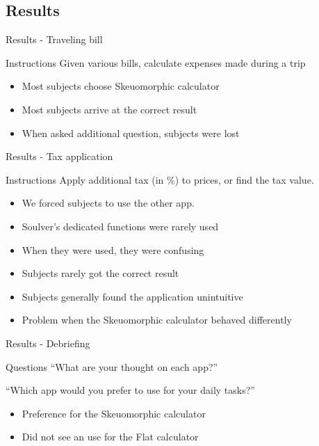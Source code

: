 \documentclass{beamer}
\begin{document}
\subsection{Results}

\begin{frame}{Results - Traveling bill}

    \begin{block}{Instructions}
        Given various bills, calculate expenses made during a trip
    \end{block}

    \begin{itemize}
        \item Most subjects choose Skeuomorphic calculator
        \item Most subjects arrive at the correct result
        \item When asked additional question, subjects were lost
    \end{itemize}

\end{frame}

\begin{frame}{Results - Tax application}

    \begin{block}{Instructions}
        Apply additional tax (in \%) to prices, or find the tax value.
    \end{block}

    \begin{itemize}
        \item We forced subjects to use the other app.
        \item Soulver's dedicated functions were rarely used
        \item When they were used, they were confusing
        \item Subjects rarely got the correct result
        \item Subjects generally found the application unintuitive
        \item Problem when the Skeuomorphic calculator behaved differently
    \end{itemize}

\end{frame}

\begin{frame}{Results - Debriefing}
    \begin{block}{Questions}
        ``What are your thought on each app?''

        ``Which app would you prefer to use for your daily tasks?''
    \end{block}

    \begin{itemize}
        \item Preference for the Skeuomorphic calculator
        \item Did not see an use for the Flat calculator
    \end{itemize}
\end{frame}
\end{document}
